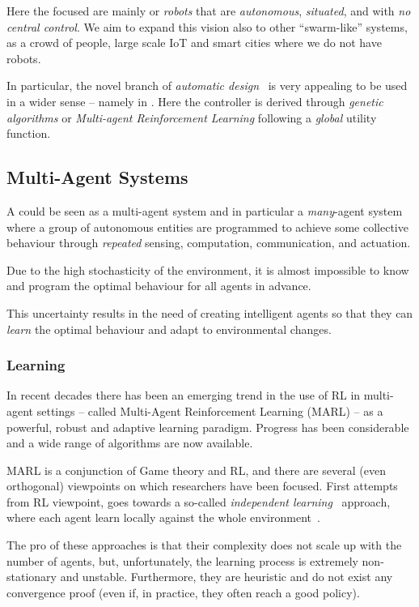 \documentclass[11pt]{article}
\begin{document}
Here the focused are mainly or \textit{robots} that are \emph{autonomous}, \emph{situated}, and with \emph{no central control}. We aim to expand this vision also to other ``swarm-like'' systems, as a crowd of people, large scale IoT and smart cities where we do not have robots. 

In particular, the novel branch of \textit{automatic design}~\cite{DBLP:journals/firai/FrancescaB16} is very appealing to be used in a wider sense -- namely in \cpsw{}. Here the controller is derived through \textit{genetic algorithms} or \textit{Multi-agent Reinforcement Learning} following a \textit{global} utility function. 
\subsection{Multi-Agent Systems}
A \cpsw{} could be seen as a multi-agent system and in particular a \emph{many}-agent system where a group of autonomous entities are programmed to achieve some collective behaviour through \emph{repeated} sensing, computation, communication, and actuation.

Due to the high stochasticity of the environment, it is almost impossible to know and program the optimal behaviour for all agents in advance.

This uncertainty results in the need of creating intelligent agents so that they can \emph{learn} the optimal behaviour and adapt to environmental changes.
\subsubsection{Learning}
In recent decades there has been an emerging trend in the use of RL 
in multi-agent settings -- called Multi-Agent Reinforcement Learning (MARL) -- as a powerful, robust and adaptive learning paradigm.
%
Progress has been considerable and a wide range of algorithms are now available.

MARL is a conjunction of Game theory and RL, 
 and there are several (even orthogonal) viewpoints on which researchers have been focused.
First attempts from RL viewpoint, 
 goes towards a so-called \textit{independent learning}~\cite{DBLP:journals/tsmc/BusoniuBS08} approach, where each agent learn locally against the whole environment~\cite{DBLP:conf/icml/Tan93}.

The pro of these approaches is that their complexity does not scale up with the number of agents, 
 but, unfortunately, the learning process is extremely non-stationary and unstable.
% 
Furthermore, they are heuristic and do not exist any convergence proof (even if, in practice, they often reach a good policy).
\end{document}
